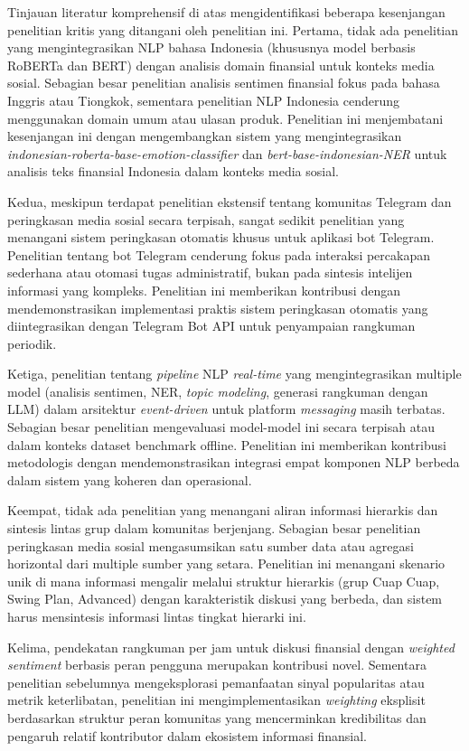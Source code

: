 Tinjauan literatur komprehensif di atas mengidentifikasi beberapa kesenjangan penelitian kritis yang ditangani oleh penelitian ini. Pertama, tidak ada penelitian yang mengintegrasikan NLP bahasa Indonesia (khususnya model berbasis RoBERTa dan BERT) dengan analisis domain finansial untuk konteks media sosial. Sebagian besar penelitian analisis sentimen finansial fokus pada bahasa Inggris atau Tiongkok, sementara penelitian NLP Indonesia cenderung menggunakan domain umum atau ulasan produk. Penelitian ini menjembatani kesenjangan ini dengan mengembangkan sistem yang mengintegrasikan \textit{indonesian-roberta-base-emotion-classifier} dan \textit{bert-base-indonesian-NER} untuk analisis teks finansial Indonesia dalam konteks media sosial.

Kedua, meskipun terdapat penelitian ekstensif tentang komunitas Telegram dan peringkasan media sosial secara terpisah, sangat sedikit penelitian yang menangani sistem peringkasan otomatis khusus untuk aplikasi bot Telegram. Penelitian tentang bot Telegram cenderung fokus pada interaksi percakapan sederhana atau otomasi tugas administratif, bukan pada sintesis intelijen informasi yang kompleks. Penelitian ini memberikan kontribusi dengan mendemonstrasikan implementasi praktis sistem peringkasan otomatis yang diintegrasikan dengan Telegram Bot API untuk penyampaian rangkuman periodik.

Ketiga, penelitian tentang \textit{pipeline} NLP \textit{real-time} yang mengintegrasikan multiple model (analisis sentimen, NER, \textit{topic modeling}, generasi rangkuman dengan LLM) dalam arsitektur \textit{event-driven} untuk platform \textit{messaging} masih terbatas. Sebagian besar penelitian mengevaluasi model-model ini secara terpisah atau dalam konteks dataset benchmark offline. Penelitian ini memberikan kontribusi metodologis dengan mendemonstrasikan integrasi empat komponen NLP berbeda dalam sistem yang koheren dan operasional.

Keempat, tidak ada penelitian yang menangani aliran informasi hierarkis dan sintesis lintas grup dalam komunitas berjenjang. Sebagian besar penelitian peringkasan media sosial mengasumsikan satu sumber data atau agregasi horizontal dari multiple sumber yang setara. Penelitian ini menangani skenario unik di mana informasi mengalir melalui struktur hierarkis (grup Cuap Cuap, Swing Plan, Advanced) dengan karakteristik diskusi yang berbeda, dan sistem harus mensintesis informasi lintas tingkat hierarki ini.

Kelima, pendekatan rangkuman per jam untuk diskusi finansial dengan \textit{weighted sentiment} berbasis peran pengguna merupakan kontribusi novel. Sementara penelitian sebelumnya mengeksplorasi pemanfaatan sinyal popularitas atau metrik keterlibatan, penelitian ini mengimplementasikan \textit{weighting} eksplisit berdasarkan struktur peran komunitas yang mencerminkan kredibilitas dan pengaruh relatif kontributor dalam ekosistem informasi finansial.

